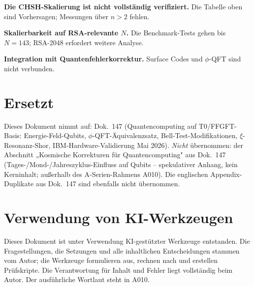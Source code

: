 \textbf{Die CHSH-Skalierung ist nicht vollständig verifiziert.} Die Tabelle oben
sind Vorhersagen; Messungen über $n>2$ fehlen.

\textbf{Skalierbarkeit auf RSA-relevante $N$.} Die Benchmark-Tests gehen bis
$N=143$; RSA-2048 erfordert weitere Analyse.

\textbf{Integration mit Quantenfehlerkorrektur.} Surface Codes und
$\phi$-QFT sind nicht verbunden.

\section{Ersetzt}

Dieses Dokument nimmt auf: Dok.~147 (Quantencomputing auf T0/FFGFT-Basis:
Energie-Feld-Qubits, $\phi$-QFT-Äquivalenzsatz, Bell-Test-Modifikationen,
$\xi$-Resonanz-Shor, IBM-Hardware-Validierung Mai 2026). \emph{Nicht} übernommen:
der Abschnitt „Kosmische Korrekturen für Quantencomputing" aus Dok.~147 (Tages-/Mond-/Jahreszyklus-Einfluss auf Qubits -- spekulativer Anhang, kein Kerninhalt;
außerhalb des A-Serien-Rahmens A010). Die englischen Appendix-Duplikate aus
Dok.~147 sind ebenfalls nicht übernommen.

\section{Verwendung von KI-Werkzeugen}

Dieses Dokument ist unter Verwendung KI-gestützter Werkzeuge entstanden. Die
Fragestellungen, die Setzungen und alle inhaltlichen Entscheidungen stammen vom
Autor; die Werkzeuge formulieren aus, rechnen nach und erstellen Prüfskripte.
Die Verantwortung für Inhalt und Fehler liegt vollständig beim Autor. Der
ausführliche Wortlaut steht in A010.

